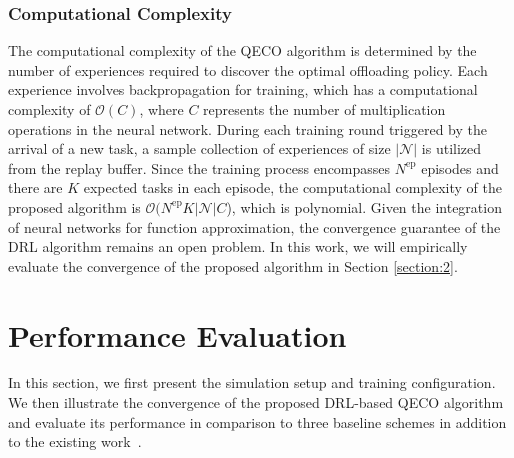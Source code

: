 \documentclass[12pt,draftclsnofoot,onecolumn]{IEEEtran}
\begin{document}
\subsubsection{Computational Complexity}


The computational complexity of the QECO algorithm is determined by the number of experiences required to discover the optimal offloading policy. Each experience involves backpropagation for training, which has a computational complexity of $\mathcal{O}(C)$, where $C$ represents the number of multiplication operations in the neural network. During each training round triggered by the arrival of a new task, a sample collection of experiences of size $|\mathcal{N}|$ is utilized from the replay buffer. Since the training process encompasses $N^{\text{ep}}$ episodes and there are $K$ expected tasks in each episode, the computational complexity of the proposed algorithm is $\mathcal{O}(N^{\text{ep}}K|\mathcal{N}|C$), which is polynomial. Given the integration of neural networks for function approximation, the convergence guarantee of the DRL algorithm remains an open problem. In this work, we will empirically evaluate the convergence of the proposed algorithm in Section \ref{section:2}.




\section{Performance Evaluation}\label{section:V}
In this section, we first present the simulation setup and training configuration. We then illustrate the convergence of the proposed DRL-based QECO algorithm and evaluate its performance in comparison to three baseline schemes in addition to the existing work~\cite{yang2018distributed}.
\end{document}
